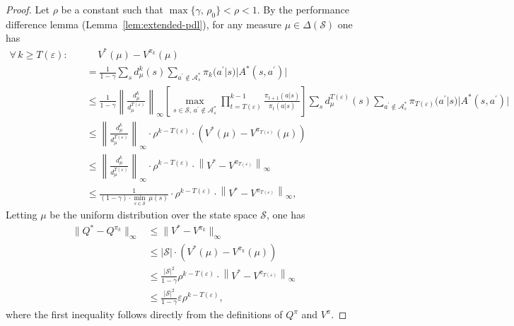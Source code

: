 \documentclass[10pt]{article}
\newcommand{\calA}{\mathcal{A}}
\newcommand{\calS}{\mathcal{S}}
\newcommand{\ls}{\left}
\newcommand{\rs}{\right}
\theoremstyle{plain}
\theoremstyle{definition}
\begin{document}
\begin{proof}
    Let $\rho$ be a constant such that $\max\{ \gamma, \, \rho_0 \} < \rho < 1$. By the performance difference lemma (Lemma~\ref{lem:extended-pdl}), for any measure $\mu \in \Delta(\calS)$ one has
    \begin{align*}
        \forall\, k \geq T(\varepsilon): \quad &\phantom{\quad\,}V^*(\mu) - V^{\pi_k}(\mu) \\[.7em]
        &= \frac{1}{1-\gamma} \sum_s d^k_\mu(s) \sum_{a^\prime \not\in\calA^*_s} \pi_k(a^\prime|s) |A^*(s,a^\prime)| \\
        &\leq \frac{1}{1-\gamma} \ls\| \frac{d^k_\mu}{d^{T(\varepsilon)}_\mu} \rs\|_\infty \ls[ \max_{s\in\calS, \, a^\prime\not\in\calA^*_s} \prod_{t=T(\varepsilon)}^{k-1} \frac{\pi_{t+1}(a|s)}{\pi_t(a|s)} \rs] \sum_s d^{T(\varepsilon)}_\mu(s) \sum_{a^\prime\not\in\calA^*_s} \pi_{T(\varepsilon)}(a^\prime|s) |A^*(s,a^\prime)| \\
        &\leq \ls\| \frac{d^k_\mu}{d^{T(\varepsilon)}_\mu} \rs\|_\infty \cdot \rho^{k-T(\varepsilon)} \cdot (V^*(\mu) - V^{\pi_{T(\varepsilon)}}(\mu)) \\
        &\leq \ls\| \frac{d^k_\mu}{d^{T(\varepsilon)}_\mu} \rs\|_\infty \cdot \rho^{k-T(\varepsilon)} \cdot \ls\| V^* - V^{\pi_{T(\varepsilon)}}\rs\|_\infty \\
        &\leq \frac{1}{(1-\gamma) \cdot \min_{s\in\calS} \, \mu(s)} \cdot \rho^{k-T(\varepsilon)} \cdot \ls\| V^* - V^{\pi_{T(\varepsilon)}}\rs\|_\infty,
    \end{align*}
    Letting $\mu$ be the uniform distribution over the state space $\calS$, one has
    \begin{align*}
        \| Q^* - Q^{\pi_k} \|_\infty &\leq \| V^* - V^{\pi_k} \|_\infty \\
        &\leq |\calS| \cdot (V^*(\mu) - V^{\pi_k}(\mu))\\ &\leq \frac{|\calS|^2}{1-\gamma} \rho ^{k-T(\varepsilon)} \cdot \ls\| V^* - V^{\pi_{T(\varepsilon)}}\rs\|_\infty \\
        &\leq \frac{|\calS|^2}{1-\gamma}\varepsilon \rho^{k-T(\varepsilon)},
    \end{align*}
    where the first inequality follows directly from the definitions of $Q^{\pi}$ and $V^{\pi}$. 
\end{proof}

\vspace{1em}
\end{document}
